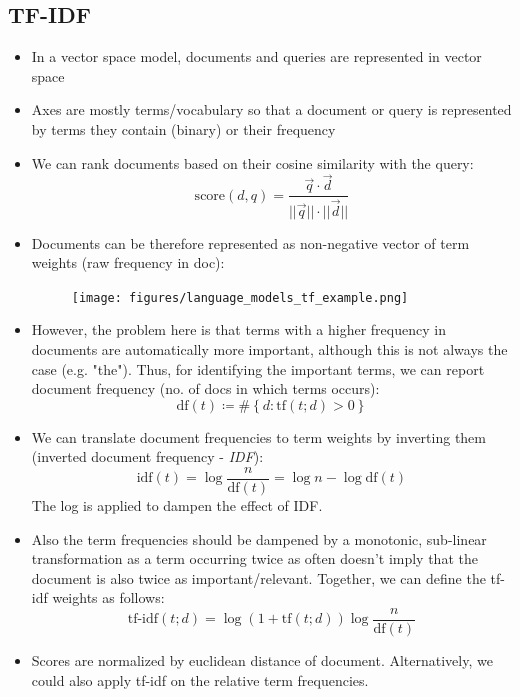 \subsection{TF-IDF}
\begin{itemize}
	\item In a vector space model, documents and queries are represented in vector space
	\item Axes are mostly terms/vocabulary so that a document or query is represented by terms they contain (binary) or their frequency
	\item We can rank documents based on their cosine similarity with the query:
	$$\text{score}(d,q) = \frac{\vec{q} \cdot \vec{d}}{||\vec{q}||\cdot ||\vec{d}||}$$
	\item Documents can be therefore represented as non-negative vector of term weights (raw frequency in doc):
	\begin{figure}[ht]
		\centering
		\texttt{[image: figures/language\_models\_tf\_example.png]}
		\label{img:language_models_tf_example}
	\end{figure}
	\item However, the problem here is that terms with a higher frequency in documents are automatically more important, although this is not always the case (e.g. "the"). Thus, for identifying the important terms, we can report document frequency (no. of docs in which terms occurs):
	$$\text{df}(t) \coloneqq \#\left\{d:\text{tf}(t;d)>0\right\}$$
	\item We can translate document frequencies to term weights by inverting them (inverted document frequency - \textit{IDF}):
	$$\text{idf}(t) = \log \frac{n}{\text{df}(t)} = \log n - \log \text{df}(t)$$
	The log is applied to dampen the effect of IDF.
	\item Also the term frequencies should be dampened by a monotonic, sub-linear transformation as a term occurring twice as often doesn't imply that the document is also twice as important/relevant. Together, we can define the tf-idf weights as follows:
	$$\text{tf-idf}(t;d) = \log \left(1+\text{tf}(t;d)\right) \log \frac{n}{\text{df}(t)}$$
	\item Scores are normalized by euclidean distance of document. Alternatively, we could also apply tf-idf on the relative term frequencies.
\end{itemize}
